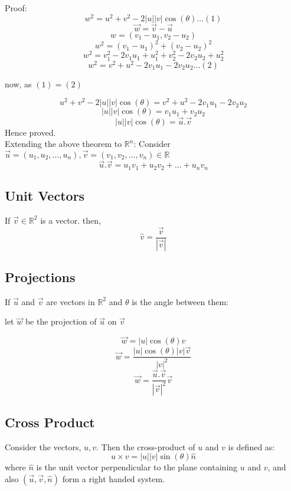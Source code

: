 \documentclass{article}
\begin{document}
Proof:
\[ w^2 = u^2 + v^2 - 2|u||v| \cos(\theta) \dots(1)\]
\[\vec{w} = \vec{v} - \vec{u}\]
\[ w = (v_1 - u_1, v_2 - u_2)\]
\[ w^2 = (v_1 - u_1)^2 + (v_2 - u_2)^2\]
\[ w^2 = v_1^2 - 2v_1u_1 + u_1^2 + v_2^2 - 2v_2u_2 + u_2^2\]
\[ w^2 = v^2 + u^2 - 2v_1u_1 - 2v_2u_2 \dots (2)\]

now, as $(1) = (2)$

\[ u^2 + v^2 - 2|u||v| \cos(\theta) = v^2 + u^2 - 2v_1u_1 - 2v_2u_2\]
\[|u||v| \cos(\theta) = v_1u_1 + v_2u_2\]
\[|u||v| \cos(\theta) = \vec{u}.\vec{v}\]
Hence proved.\\[1pt]

Extending the above theorem to $\mathbb{R}^n$:
Consider $\vec{u} = (u_1, u_2, \dots, u_n), \vec{v} = (v_1, v_2, \dots, v_n) \in \mathbb{R}$
\[\vec{u}.\vec{v} = u_1v_1 + u_2v_2 + \dots + u_nv_n\]

\subsection{Unit Vectors}
If $\vec{v} \in \mathbb{R}^2$ is a vector.
then, \[\hat{v} = \frac{\vec{v}}{|\vec{v}|}\]

\subsection{Projections}
If $\vec{u}$ and $\vec{v}$ are vectors in $\mathbb{R}^2$ and $\theta$ is the angle between them:


let $\vec{w}$ be the projection of $\vec{u}$ on $\vec{v}$

\[\vec{w} = |u| \cos(\theta) \hat{v}\]
\[\vec{w} = \frac{|u| \cos(\theta)|v|\vec{v} }{|v|^2}\]
\[\vec{w} = \frac{\vec{u}.\vec{v}}{|\vec{v}|^2} \vec{v}\]

\subsection{Cross Product}
Consider the vectors, $u,v$. Then the cross-product of $u$ and $v$ is defined as:
\[u \times v = |u||v|\sin(\theta) \hat{n}\]
where $\hat{n}$ is the unit vector perpendicular to the plane containing $u$ and $v$, and also $(\vec{u}, \vec{v}, \hat{n})$ form a right handed system.
\end{document}
